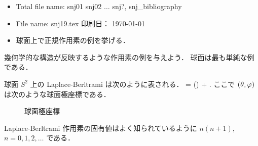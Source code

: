 %
\hide
\vspace{-4mm}
\begin{itemize} \itemsep=-2mm \parsep=0mm
\item Total file name: snj01 snj02 $\dots $ snj?, snj\_bibliography
\item File name: snj19.tex \hfill 印刷日： \today \ \now
\item 球面上で正規作用素の例を挙げる．
\end{itemize}
\endhide
{} %
幾何学的な構造が反映するような作用素の例を与えよう．
球面は最も単純な例である．

球面 $S^2$ 上の Laplace-Berltrami は次のように表される．
\bdm %
\Laplace
=  \frac{\del}{\del \theta}
  \biggl(\sin \theta \frac{\del}{\del \theta}\biggr)
  +  .
\edm %
ここで $(\theta,\varphi)$ は次のような球面極座標である．

\begin{figure}[h]
\begin{center}
\caption{球面極座標}
\end{center}
\end{figure}

Laplace-Berltrami 作用素の固有値はよく知られているように
$n(n+1)$, $n=0,1,2,\dots$ である．

